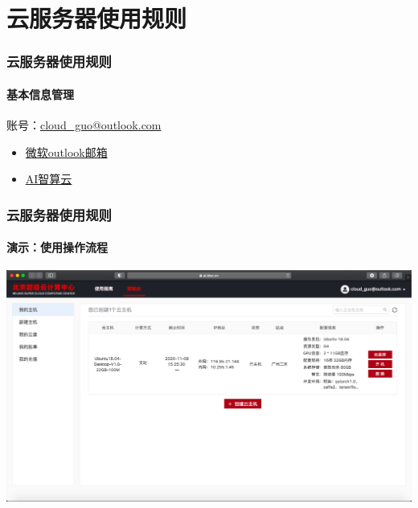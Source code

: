 \documentclass[10pt]{beamer}
\begin{document}
    \section{云服务器使用规则}
        \begin{frame}
            \frametitle{云服务器使用规则}
                \framesubtitle{基本信息管理}
                    账号：\href{mailto: cloud\_guo@outlook.com}{cloud\_guo@outlook.com} \\
                    \hspace*{\fill}
                    \begin{itemize}
                        \item {\href{https://outlook.live.com/owa/}{微软outlook邮箱}}
                        \item {\href{https://ai.blsc.cn/\#/login}{AI智算云}}
                    \end{itemize}

        \end{frame}

        \begin{frame}
            \frametitle{云服务器使用规则}
                \framesubtitle{演示：使用操作流程}
                    \centering

                    \href{https://ai.blsc.cn/\#/cloud/compute}{
                        \includegraphics[width=\textwidth]{src/img/Console.png}
                        }

        \end{frame}
\end{document}
